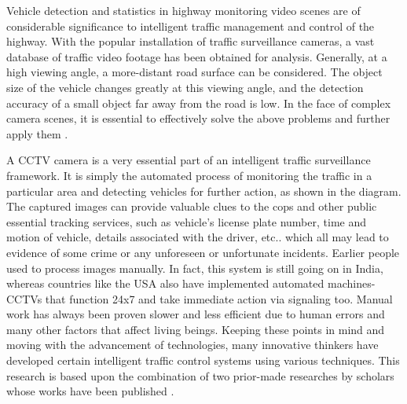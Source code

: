 \begin{sloppypar}
Vehicle detection and statistics in highway monitoring video scenes are of considerable significance to intelligent traffic management and control of the highway. With the popular installation of traffic surveillance cameras, a vast database of traffic video footage has been obtained for analysis. Generally, at a high viewing angle, a more-distant road surface can be considered. The object size of the vehicle changes greatly at this viewing angle, and the detection accuracy of a small object far away from the road is low. In the face of complex camera scenes, it is essential to effectively solve the above problems and further apply them \cite{SongH2019}. 

A CCTV camera is a very essential part of an intelligent traffic surveillance framework. It is simply the automated process of monitoring the traffic in a particular area and detecting vehicles for further action, as shown in the diagram. The captured images can provide valuable clues to the cops and other public essential tracking services, such as vehicle’s license plate number, time and motion of vehicle, details associated with the driver, etc.. which all may lead to evidence of some crime or any unforeseen or unfortunate incidents. Earlier people used to process images manually. In fact, this system is still going on in India, whereas countries like the USA also have implemented automated machines- CCTVs that function 24x7 and take immediate action via signaling too. Manual work has always been proven slower and less efficient due to human errors and many other factors that affect living beings. Keeping these points in mind and moving with the advancement of technologies, many innovative thinkers have developed certain intelligent traffic control systems using various techniques. This research is based upon the combination of two prior-made researches by scholars whose works have been published \cite{Baran2016}.

\end{sloppypar}



{}
\specialsection %
\headerspecialsection

{\hypersetup{urlcolor=ntnu,linkcolor=sophia} %


}
